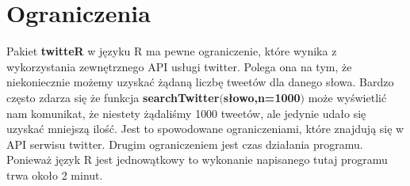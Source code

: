 \documentclass[12pt,a4paper]{report}
\begin{document}
\section[Ograniczenia] {Ograniczenia}
Pakiet \textbf{twitteR} w języku R ma pewne ograniczenie, które wynika z wykorzystania zewnętrznego API usługi twitter. Polega ona na tym, że niekoniecznie możemy uzyskać żądaną liczbę tweetów dla danego słowa. Bardzo często zdarza się że funkcja \textbf{searchTwitter$($słowo,n=1000$)$} może wyświetlić nam komunikat, że niestety żądaliśmy 1000 tweetów, ale jedynie udało się uzyskać mniejszą ilość. Jest to spowodowane ograniczeniami, które znajdują się w API serwisu twitter. Drugim ograniczeniem jest czas działania programu. Ponieważ język R jest jednowątkowy to wykonanie napisanego tutaj programu trwa około 2 minut. 

\newpage

\begin{thebibliography}{1}

\end{thebibliography}
\end{document}
